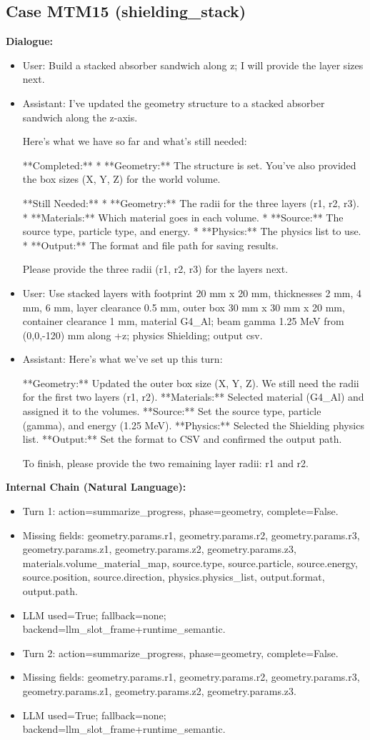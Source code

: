 \documentclass[11pt]{ctexart}
\begin{document}
\subsection{Case MTM15 (shielding\_stack)}
\textbf{Dialogue:}
\begin{itemize}
\item User: Build a stacked absorber sandwich along z; I will provide the layer sizes next.
\item Assistant: I've updated the geometry structure to a stacked absorber sandwich along the z-axis.

Here's what we have so far and what's still needed:

**Completed:**
*   **Geometry:** The structure is set. You've also provided the box sizes (X, Y, Z) for the world volume.

**Still Needed:**
*   **Geometry:** The radii for the three layers (r1, r2, r3).
*   **Materials:** Which material goes in each volume.
*   **Source:** The source type, particle type, and energy.
*   **Physics:** The physics list to use.
*   **Output:** The format and file path for saving results.

Please provide the three radii (r1, r2, r3) for the layers next.
\item User: Use stacked layers with footprint 20 mm x 20 mm, thicknesses 2 mm, 4 mm, 6 mm, layer clearance 0.5 mm, outer box 30 mm x 30 mm x 20 mm, container clearance 1 mm, material G4\_Al; beam gamma 1.25 MeV from (0,0,-120) mm along +z; physics Shielding; output csv.
\item Assistant: Here's what we've set up this turn:

**Geometry:** Updated the outer box size (X, Y, Z). We still need the radii for the first two layers (r1, r2).
**Materials:** Selected material (G4\_Al) and assigned it to the volumes.
**Source:** Set the source type, particle (gamma), and energy (1.25 MeV).
**Physics:** Selected the Shielding physics list.
**Output:** Set the format to CSV and confirmed the output path.

To finish, please provide the two remaining layer radii: r1 and r2.
\end{itemize}
\textbf{Internal Chain (Natural Language):}
\begin{itemize}
\item Turn 1: action=summarize\_progress, phase=geometry, complete=False.
\item Missing fields: geometry.params.r1, geometry.params.r2, geometry.params.r3, geometry.params.z1, geometry.params.z2, geometry.params.z3, materials.volume\_material\_map, source.type, source.particle, source.energy, source.position, source.direction, physics.physics\_list, output.format, output.path.
\item LLM used=True; fallback=none; backend=llm\_slot\_frame+runtime\_semantic.
\item Turn 2: action=summarize\_progress, phase=geometry, complete=False.
\item Missing fields: geometry.params.r1, geometry.params.r2, geometry.params.r3, geometry.params.z1, geometry.params.z2, geometry.params.z3.
\item LLM used=True; fallback=none; backend=llm\_slot\_frame+runtime\_semantic.
\end{itemize}
\end{document}

